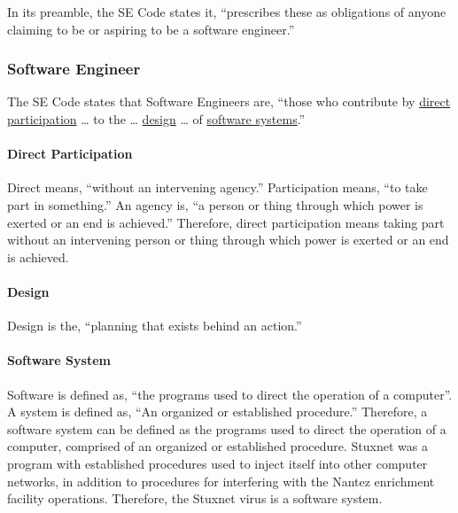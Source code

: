 \documentclass[12pt]{article}
\begin{document}
\begin{multicols}{2}
In its preamble, the SE Code states it, ``prescribes these as obligations of anyone claiming to be or aspiring to be a software engineer.''\cite{softwareEngineeringCodeOfEthics}

\subsubsection{Software Engineer}

The SE Code states that Software Engineers are, ``those who contribute by \underline{direct participation} … to the … \underline{design} … of \underline{software systems}.''\cite{softwareEngineeringCodeOfEthics}

\paragraph{Direct Participation}

Direct means, ``without an intervening agency.''\cite{merriamWebsterDefinitions} Participation means, ``to take part in something.''\cite{cambridgeDictionary} An agency is, ``a person or thing through which power is exerted or an end is achieved.''\cite{merriamWebsterDefinitions} Therefore, direct participation means taking part without an intervening person or thing through which power is exerted or an end is achieved.

\paragraph{Design}

Design is the, ``planning that exists behind an action.''\cite{oxfordDictionary}

\paragraph{Software System}

Software is defined as, ``the programs used to direct the operation of a computer''.\cite{softwareDefinition} A system is defined as, ``An organized or established procedure.''\cite{merriamWebsterDefinitions} Therefore, a software system can be defined as the programs used to direct the operation of a computer, comprised of an organized or established procedure. Stuxnet was a program with established procedures used to inject itself into other computer networks, in addition to procedures for interfering with the Nantez enrichment facility operations. Therefore, the Stuxnet virus is a software system.\cite{w32.stuxnetDossier}


\end{multicols}
\end{document}
